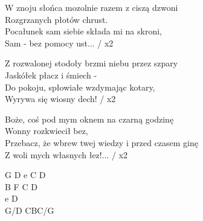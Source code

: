 \begin{text}
    W znoju słońca mozolnie razem z ciszą dzwoni\\
    Rozgrzanych płotów chrust.\\
    Pocałunek sam siebie składa mi na skroni,\\
    Sam - bez pomocy ust... / x2

    Z rozwalonej stodoły brzmi niebu przez szpary\\
    Jaskółek płacz i śmiech -\\
    Do pokoju, spłowiałe wzdymając kotary,\\
    Wyrywa się wiosny dech! / x2

    Boże, coś pod mym oknem na czarną godzinę\\
    Wonny rozkwiecił bez,\\
    Przebacz, że wbrew twej wiedzy i przed czasem ginę\\
    Z woli mych własnych łez!... / x2
\end{text}
\begin{chord}
    G D e C D\\
    B F C D\\
    e D\\
    G/D CBC/G
\end{chord}